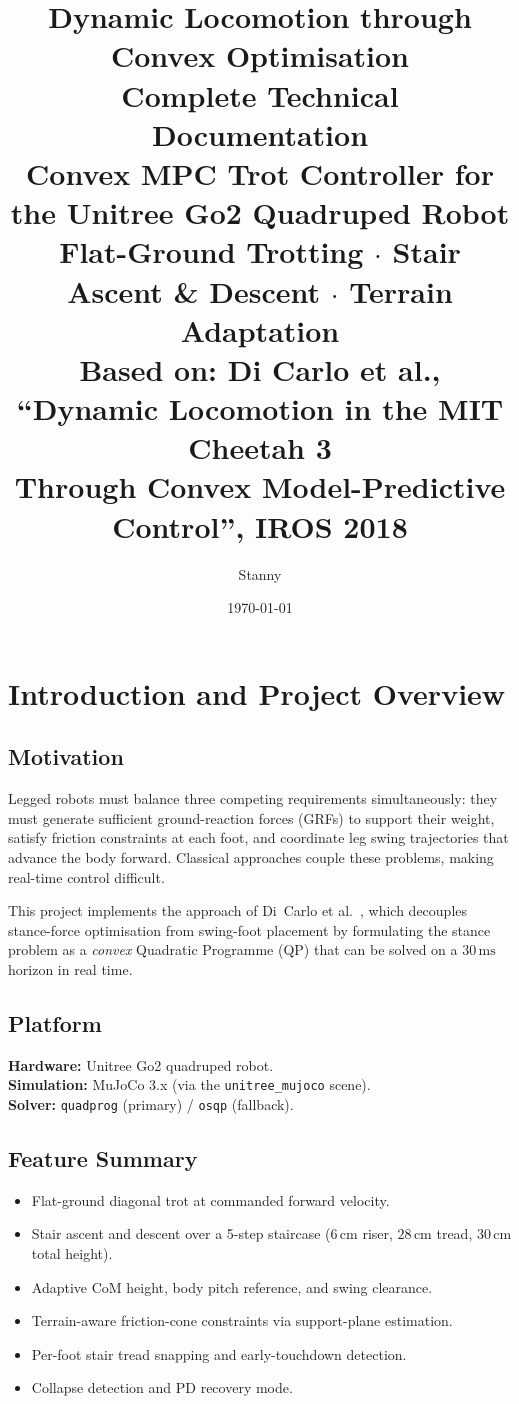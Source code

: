 \documentclass[12pt,a4paper]{report}
\title{
    \vspace{-1cm}
    {\Large\textbf{Dynamic Locomotion through Convex Optimisation}}\\[0.8em]
    {\large Complete Technical Documentation}\\[0.4em]
    {\normalsize Convex MPC Trot Controller for the Unitree Go2 Quadruped Robot}\\[0.3em]
    {\normalsize Flat-Ground Trotting $\cdot$ Stair Ascent \& Descent $\cdot$ Terrain Adaptation}\\[1em]
    {\small Based on: Di Carlo et al., ``Dynamic Locomotion in the MIT Cheetah 3\\
    Through Convex Model-Predictive Control'', IROS 2018}
}
\author{Stanny}
\date{\today}
\begin{document}

\maketitle
\tableofcontents
\listoftables
\newpage

\chapter{Introduction and Project Overview}

\section{Motivation}

Legged robots must balance three competing requirements simultaneously: they must
generate sufficient ground-reaction forces (GRFs) to support their weight,
satisfy friction constraints at each foot, and coordinate leg swing trajectories
that advance the body forward.  Classical approaches couple these problems,
making real-time control difficult.

This project implements the approach of Di~Carlo et al.\ \cite{diCarlo2018},
which decouples stance-force optimisation from swing-foot placement by
formulating the stance problem as a \emph{convex} Quadratic Programme (QP)
that can be solved on a $30\,\mathrm{ms}$ horizon in real time.

\section{Platform}

\textbf{Hardware:} Unitree Go2 quadruped robot.\\
\textbf{Simulation:} MuJoCo 3.x (via the \texttt{unitree\_mujoco} scene).\\
\textbf{Solver:} \texttt{quadprog} (primary) / \texttt{osqp} (fallback).

\section{Feature Summary}

\begin{itemize}[noitemsep]
    \item Flat-ground diagonal trot at commanded forward velocity.
    \item Stair ascent and descent over a 5-step staircase
          ($6\,\mathrm{cm}$ riser, $28\,\mathrm{cm}$ tread, $30\,\mathrm{cm}$ total height).
    \item Adaptive CoM height, body pitch reference, and swing clearance.
    \item Terrain-aware friction-cone constraints via support-plane estimation.
    \item Per-foot stair tread snapping and early-touchdown detection.
    \item Collapse detection and PD recovery mode.
\end{itemize}
\end{document}
